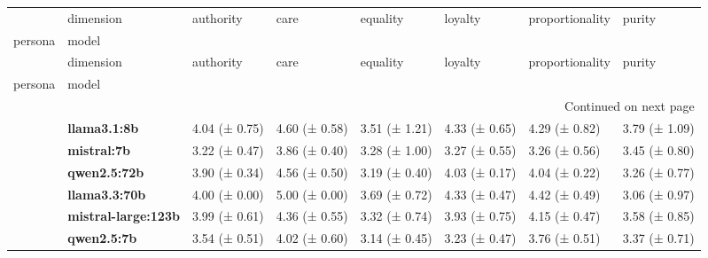\begin{longtable}{llllllll}
\toprule
 & dimension & authority & care & equality & loyalty & proportionality & purity \\
persona & model &  &  &  &  &  &  \\
\midrule
\endfirsthead
\toprule
 & dimension & authority & care & equality & loyalty & proportionality & purity \\
persona & model &  &  &  &  &  &  \\
\midrule
\endhead
\midrule
\multicolumn{8}{r}{Continued on next page} \\
\midrule
\endfoot
\bottomrule
\endlastfoot
\multirow[t]{6}{*}{\textbf{base}} & \textbf{llama3.1:8b} & 4.04 (± 0.75) & 4.60 (± 0.58) & 3.51 (± 1.21) & 4.33 (± 0.65) & 4.29 (± 0.82) & 3.79 (± 1.09) \\
\textbf{} & \textbf{mistral:7b} & 3.22 (± 0.47) & 3.86 (± 0.40) & 3.28 (± 1.00) & 3.27 (± 0.55) & 3.26 (± 0.56) & 3.45 (± 0.80) \\
\textbf{} & \textbf{qwen2.5:72b} & 3.90 (± 0.34) & 4.56 (± 0.50) & 3.19 (± 0.40) & 4.03 (± 0.17) & 4.04 (± 0.22) & 3.26 (± 0.77) \\
\textbf{} & \textbf{llama3.3:70b} & 4.00 (± 0.00) & 5.00 (± 0.00) & 3.69 (± 0.72) & 4.33 (± 0.47) & 4.42 (± 0.49) & 3.06 (± 0.97) \\
\textbf{} & \textbf{mistral-large:123b} & 3.99 (± 0.61) & 4.36 (± 0.55) & 3.32 (± 0.74) & 3.93 (± 0.75) & 4.15 (± 0.47) & 3.58 (± 0.85) \\
\textbf{} & \textbf{qwen2.5:7b} & 3.54 (± 0.51) & 4.02 (± 0.60) & 3.14 (± 0.45) & 3.23 (± 0.47) & 3.76 (± 0.51) & 3.37 (± 0.71) \\
\cline{1-8}
\end{longtable}
